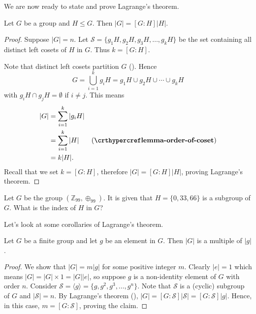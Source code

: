 We are now ready to state and prove Lagrange's theorem.
\begin{theorem}[Lagrange]\label{thrm-lagrange}
    Let $G$ be a group and $H \leq G$. Then $|G| = [G:H]|H|$.
\end{theorem}
\begin{proof}
    Suppose $|G| = n$. Let $\mathcal{S} = \{g_1H, g_2H, g_3H, \dots, g_kH\}$ be the set containing all distinct left cosets of $H$ in $G$. Thus $k = [G: H]$.

    Note that distinct left cosets partition $G$ (). Hence
    \[
        G = \bigcup_{i=1}^k g_iH = g_1H \cup g_2H \cup \cdots \cup g_kH
    \]
    with $g_iH \cap g_jH = \emptyset$ if $i \neq j$. This means
    \begin{align*}
        |G| &= \sum_{i=1}^k|g_iH|\\
        &=\sum_{i=1}^k|H| & (\myref{lemma-order-of-coset})\\
        &= k|H|.
    \end{align*}
    Recall that we set $k = [G: H]$, therefore $|G| = [G:H]|H|$, proving Lagrange's theorem.
\end{proof}

\begin{exercise}
    Let $G$ be the group $(\mathbb{Z}_{99}, \oplus_{99})$. It is given that $H = \{0, 33, 66\}$ is a subgroup of $G$. What is the index of $H$ in $G$?
\end{exercise}

Let's look at some corollaries of Lagrange's theorem.
\begin{corollary}\label{corollary-order-of-group-multiple-of-order-of-element}
    Let $G$ be a finite group and let $g$ be an element in $G$. Then $|G|$ is a multiple of $|g|$.
\end{corollary}
\begin{proof}
    We show that $|G| = m|g|$ for some positive integer $m$. Clearly $|e| = 1$ which means $|G| = |G| \times 1 = |G||e|$, so suppose $g$ is a non-identity element of $G$ with order $n$. Consider $\mathcal{S} = \langle g \rangle = \{g, g^2, g^3, \dots, g^n\}$. Note that $\mathcal{S}$ is a (cyclic) subgroup of $G$ and $|\mathcal{S}| = n$. By Lagrange's theorem (), $|G| = [G:\mathcal{S}]|\mathcal{S}| = [G:\mathcal{S}]|g|$. Hence, in this case, $m = [G:\mathcal{S}]$, proving the claim.
\end{proof}

\newpage

